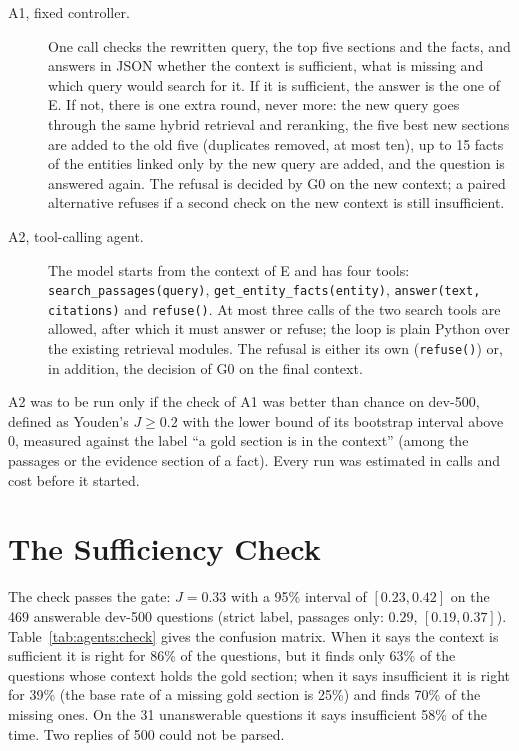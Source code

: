 \begin{description}
    \item[A1, fixed controller.] One call checks the rewritten query, the top five sections and
        the facts, and answers in JSON whether the context is sufficient, what is missing and which
        query would search for it. If it is sufficient, the answer is the one of E. If not, there is
        one extra round, never more: the new query goes through the same hybrid retrieval and
        reranking, the five best new sections are added to the old five (duplicates removed, at
        most ten), up to 15 facts of the entities linked only by the new query are added, and the
        question is answered again. The refusal is decided by G0 on the new context; a paired
        alternative refuses if a second check on the new context is still insufficient.
    \item[A2, tool-calling agent.] The model starts from the context of E and has four tools:
        \texttt{search\_passages(query)}, \texttt{get\_entity\_facts(entity)},
        \texttt{answer(text, citations)} and \texttt{refuse()}. At most three calls of the two
        search tools are allowed, after which it must answer or refuse; the loop is plain Python
        over the existing retrieval modules. The refusal is either its own (\texttt{refuse()}) or,
        in addition, the decision of G0 on the final context.
\end{description}
A2 was to be run only if the check of A1 was better than chance on dev-500, defined as Youden's $J
\ge 0.2$ with the lower bound of its bootstrap interval above 0, measured against the label ``a gold
section is in the context'' (among the passages or the evidence section of a fact). Every run
was estimated in calls and cost before it started.


\section{The Sufficiency Check}\label{sec:agents:check}

The check passes the gate: $J = 0.33$ with a 95\% interval of $[0.23, 0.42]$ on the 469 answerable
dev-500 questions (strict label, passages only: $0.29$, $[0.19, 0.37]$). Table~\ref{tab:agents:check}
gives the confusion matrix. When it says the context is sufficient it is right for 86\% of the
questions, but it finds only 63\% of the questions whose context holds the gold section; when it
says insufficient it is right for 39\% (the base rate of a missing gold section is 25\%) and finds
70\% of the missing ones. On the 31 unanswerable questions it says insufficient 58\% of the time.
Two replies of 500 could not be parsed.

